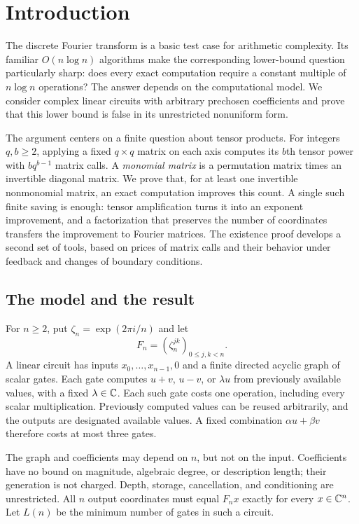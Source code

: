 \section{Introduction}\label{intro:sec:introduction}

The discrete Fourier transform is a basic test case for arithmetic
complexity. Its familiar $O(n\log n)$ algorithms make the corresponding
lower-bound question particularly sharp: does every exact computation
require a constant multiple of $n\log n$ operations? The answer depends
on the computational model. We consider complex linear circuits with
arbitrary prechosen coefficients and prove that this lower bound is
false in its unrestricted nonuniform form.

The argument centers on a finite question about tensor products.
For integers $q,b\ge2$, applying a fixed $q\times q$ matrix on each axis
computes its $b$th tensor power with $bq^{b-1}$ matrix calls.
A \emph{monomial matrix} is a permutation matrix times an invertible
diagonal matrix. We prove that, for at least one invertible nonmonomial
matrix, an exact computation improves this
count. A single such finite saving is enough: tensor amplification
turns it into an exponent improvement, and a factorization that preserves
the number of coordinates transfers the improvement to Fourier matrices.
The existence proof develops a second set of tools, based on prices of
matrix calls and their behavior under feedback and changes of boundary
conditions.

\subsection{The model and the result}

For $n\ge2$, put $\zeta_n=\exp(2\pi i/n)$ and let
\begin{equation}\label{intro:eq:fourier}
 F_n=(\zeta_n^{jk})_{0\le j,k<n}.
\end{equation}
A linear circuit has inputs $x_0,\ldots,x_{n-1},0$ and a finite directed
acyclic graph of scalar gates. Each gate computes $u+v$, $u-v$, or
$\lambda u$ from previously available values, with a fixed
$\lambda\in\mathbb C$. Each such gate costs one operation, including every
scalar multiplication. Previously computed values can be reused
arbitrarily, and the outputs are designated available values. A fixed
combination $\alpha u+\beta v$ therefore costs at most three gates.

The graph and coefficients may depend on $n$, but not on the input.
Coefficients have no bound on magnitude, algebraic degree, or description
length; their generation is not charged. Depth, storage, cancellation,
and conditioning are unrestricted. All $n$ output coordinates must equal
$F_nx$ exactly for every $x\in\mathbb C^n$. Let $L(n)$ be the minimum number of
gates in such a circuit.

